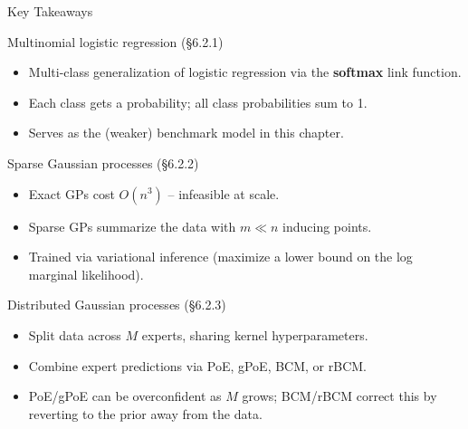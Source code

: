 \documentclass[aspectratio=169,10pt]{beamer}
\begin{document}
\begin{frame}[allowframebreaks]{Key Takeaways}
  \begin{block}{Multinomial logistic regression (\S6.2.1)}
    \begin{itemize}
      \item Multi-class generalization of logistic regression via the
            \textbf{softmax} link function.
      \item Each class gets a probability; all class probabilities sum to 1.
      \item Serves as the (weaker) benchmark model in this chapter.
    \end{itemize}
  \end{block}
  \begin{block}{Sparse Gaussian processes (\S6.2.2)}
    \begin{itemize}
      \item Exact GPs cost $O(n^3)$ -- infeasible at scale.
      \item Sparse GPs summarize the data with $m \ll n$ inducing points.
      \item Trained via variational inference (maximize a lower bound on the
            log marginal likelihood).
    \end{itemize}
  \end{block}
  \begin{block}{Distributed Gaussian processes (\S6.2.3)}
    \begin{itemize}
      \item Split data across $M$ experts, sharing kernel hyperparameters.
      \item Combine expert predictions via PoE, gPoE, BCM, or rBCM.
      \item PoE/gPoE can be overconfident as $M$ grows; BCM/rBCM correct
            this by reverting to the prior away from the data.
    \end{itemize}
  \end{block}

  \framebreak


\end{frame}
\end{document}
